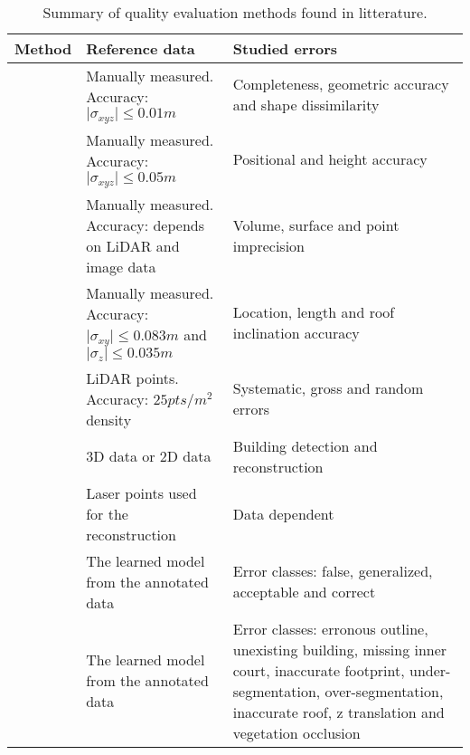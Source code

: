 \documentclass[../main.tex]{subfiles}
\begin{document}
    \begin{sidewaystable}[H]
        \begin{center}
            \begin{tabular}{c x{6cm} x{8cm}}
                \toprule
                Method & Reference data & Studied errors \\
                \midrule
                \cite{Henricsson1997} & Manually measured. Accuracy: $ \vert \sigma_{xyz} \vert \leq 0.01 m$ & Completeness, geometric accuracy and shape dissimilarity \\
                \midrule
                \cite{Voegtle2003} & Manually measured. Accuracy: $ \vert \sigma_{xyz} \vert \leq 0.05 m$ & Positional and height accuracy \\
                \midrule
                \cite{Zeng2014} & Manually measured. Accuracy: depends on LiDAR and image data & Volume, surface and point imprecision \\
                \midrule
                \cite{Kaartinen2005} & Manually measured. Accuracy: $ \vert \sigma_{xy} \vert \leq 0.083 m$ and $ \vert \sigma_{z} \vert \leq 0.035 m$ & Location, length and roof inclination accuracy \\
                \midrule
                \cite{Akca2010} & LiDAR points. Accuracy: $25 pts/m^2$ density & Systematic, gross and random errors\\
                \midrule
                \cite{Schuster2003} & 3D data or 2D data & Building detection and reconstruction \\
                \midrule
                \cite{OudeElberink2010} & Laser points used for the reconstruction & Data dependent \\
                \midrule
                \cite{Boudet2006} & The learned model from the annotated data & Error classes: false, generalized, acceptable and correct \\
                \midrule
                \cite{michelin2013quality} & The learned model from the annotated data & Error classes: erronous outline, unexisting building, missing inner court, inaccurate footprint, under-segmentation, over-segmentation, inaccurate roof, z translation and vegetation occlusion \\
                \bottomrule
            \end{tabular}
        \end{center}
        \caption{\label{tab::bib_sum} Summary of quality evaluation methods found in litterature.}
    \end{sidewaystable}
\end{document}
